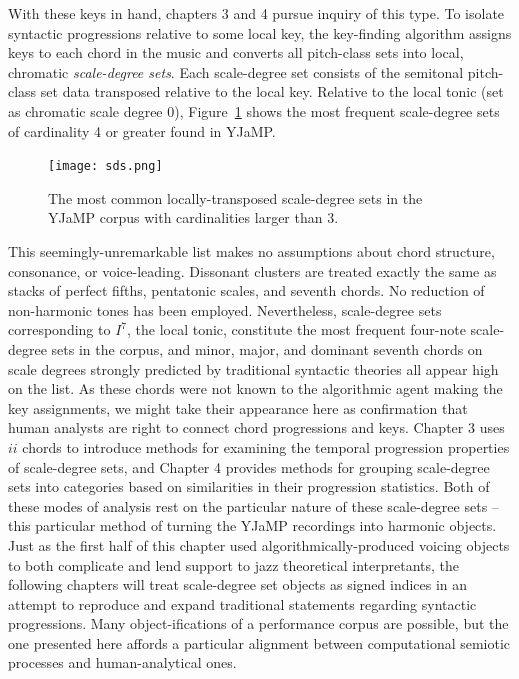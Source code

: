 With these keys in hand, chapters 3 and 4 pursue inquiry of this type.  To isolate syntactic progressions relative to some local key, the key-finding algorithm assigns keys to each chord in the music and converts all pitch-class sets into local, chromatic \emph{scale-degree sets}.  Each scale-degree set consists of the semitonal pitch-class set data transposed relative to the local key.  Relative to the local tonic (set as chromatic scale degree 0), Figure~\ref{sds} shows the most frequent scale-degree sets of cardinality 4 or greater found in YJaMP.

\begin{figure}%
	\centering
	\caption{The most common locally-transposed scale-degree sets in the YJaMP corpus with cardinalities larger than 3.}
	\texttt{[image: sds.png]}
	\label{sds}
\end{figure}

This seemingly-unremarkable list makes no assumptions about chord structure, consonance, or voice-leading.  Dissonant clusters are treated exactly the same as stacks of perfect fifths, pentatonic scales, and seventh chords.  No reduction of non-harmonic tones has been employed.  Nevertheless, scale-degree sets corresponding to $I^7$, the local tonic, constitute the most frequent four-note scale-degree sets in the corpus, and minor, major, and dominant seventh chords on scale degrees strongly predicted by traditional syntactic theories all appear high on the list.  As these chords were not known to the algorithmic agent making the key assignments, we might take their appearance here as confirmation that human analysts are right to connect chord progressions and keys.  Chapter 3 uses $ii$ chords to introduce methods for examining the temporal progression properties of scale-degree sets, and Chapter 4 provides methods for grouping scale-degree sets into categories based on similarities in their progression statistics.  Both of these modes of analysis rest on the particular nature of these scale-degree sets -- this particular method of turning the YJaMP recordings into harmonic objects.  Just as the first half of this chapter used algorithmically-produced voicing objects to both complicate and lend support to jazz theoretical interpretants, the following chapters will treat scale-degree set objects as signed indices in an attempt to reproduce and expand traditional statements regarding syntactic progressions.  Many object-ifications of a performance corpus are possible, but the one presented here affords a particular alignment between computational semiotic processes and human-analytical ones.
	
